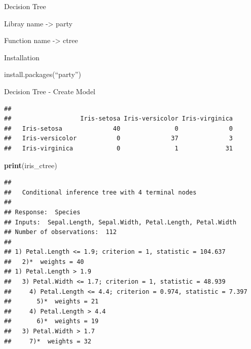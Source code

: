 \documentclass[ignorenonframetext,]{beamer}
\newenvironment{Shaded}{\begin{snugshade}}{\end{snugshade}}
\newcommand{\KeywordTok}[1]{\textcolor[rgb]{0.13,0.29,0.53}{\textbf{{#1}}}}
\newcommand{\DataTypeTok}[1]{\textcolor[rgb]{0.13,0.29,0.53}{{#1}}}
\newcommand{\StringTok}[1]{\textcolor[rgb]{0.31,0.60,0.02}{{#1}}}
\newcommand{\CommentTok}[1]{\textcolor[rgb]{0.56,0.35,0.01}{\textit{{#1}}}}
\newcommand{\NormalTok}[1]{{#1}}
\begin{document}
\begin{frame}{Decision Tree}

Libray name -\textgreater{} party

Function name -\textgreater{} ctree

Installation

install.packages(``party'')

\end{frame}

\begin{frame}[fragile]{Decision Tree - Create Model}

\begin{Shaded}
\end{Shaded}

\begin{verbatim}
##                  
##                   Iris-setosa Iris-versicolor Iris-virginica
##   Iris-setosa              40               0              0
##   Iris-versicolor           0              37              3
##   Iris-virginica            0               1             31
\end{verbatim}

\end{frame}

\begin{frame}[fragile]{}

\begin{Shaded}
\begin{Highlighting}[]
\KeywordTok{print}\NormalTok{(iris_ctree)}
\end{Highlighting}
\end{Shaded}

\begin{verbatim}
## 
##   Conditional inference tree with 4 terminal nodes
## 
## Response:  Species 
## Inputs:  Sepal.Length, Sepal.Width, Petal.Length, Petal.Width 
## Number of observations:  112 
## 
## 1) Petal.Length <= 1.9; criterion = 1, statistic = 104.637
##   2)*  weights = 40 
## 1) Petal.Length > 1.9
##   3) Petal.Width <= 1.7; criterion = 1, statistic = 48.939
##     4) Petal.Length <= 4.4; criterion = 0.974, statistic = 7.397
##       5)*  weights = 21 
##     4) Petal.Length > 4.4
##       6)*  weights = 19 
##   3) Petal.Width > 1.7
##     7)*  weights = 32
\end{verbatim}

\end{frame}
\end{document}
